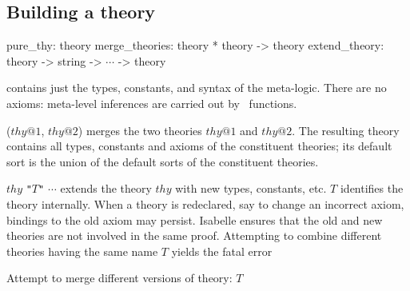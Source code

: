 \subsection{Building a theory}
\label{BuildingATheory}
\begin{ttbox} 
pure_thy: theory
merge_theories: theory * theory -> theory
extend_theory: theory -> string -> \(\cdots\) -> theory
\end{ttbox}
\begin{ttdescription}
\item[\ttindexbold{pure_thy}] contains just the types, constants, and syntax
  of the meta-logic.  There are no axioms: meta-level inferences are carried
  out by \ML\ functions.
\item[\ttindexbold{merge_theories} ($thy@1$, $thy@2$)] merges the two
  theories $thy@1$ and $thy@2$.  The resulting theory contains all types,
  constants and axioms of the constituent theories; its default sort is the
  union of the default sorts of the constituent theories.
\item [\ttindexbold{extend_theory} $thy$ {\tt"}$T${\tt"} $\cdots$] extends
  the theory $thy$ with new types, constants, etc.  $T$ identifies the theory
  internally.  When a theory is redeclared, say to change an incorrect axiom,
  bindings to the old axiom may persist.  Isabelle ensures that the old and
  new theories are not involved in the same proof.  Attempting to combine
  different theories having the same name $T$ yields the fatal error
\begin{ttbox}
Attempt to merge different versions of theory: \(T\)
\end{ttbox}
\end{ttdescription}



